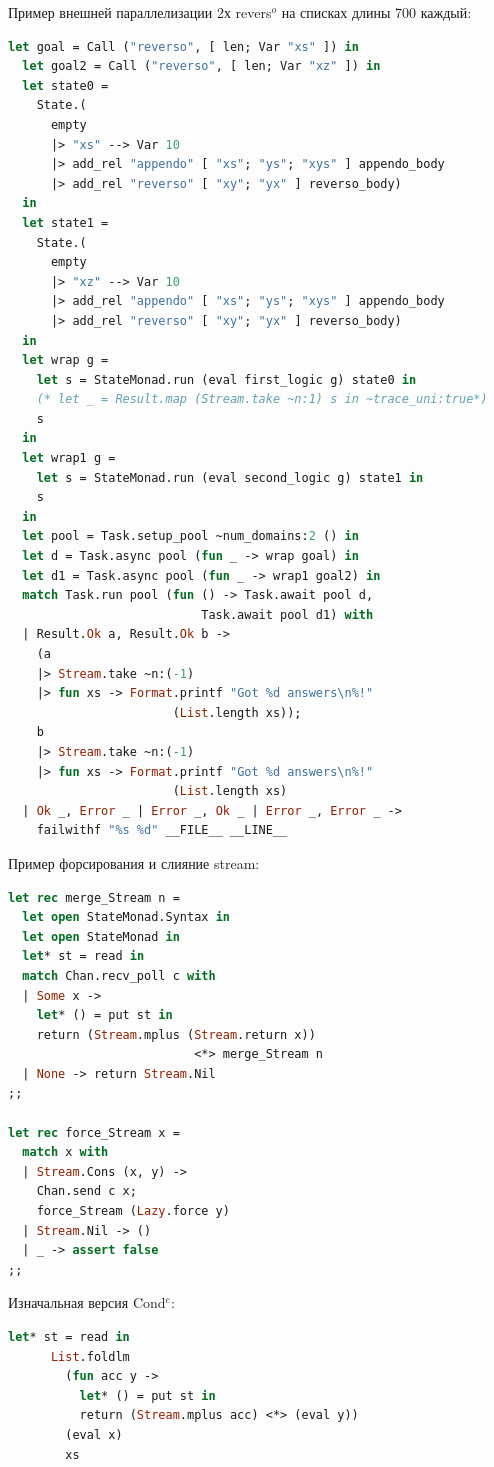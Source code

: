 Пример внешней параллелизации 2х revers$^o$ на списках длины 700 каждый:

\begin{lstlisting}[caption=parallel revers$^o$, language=OCaml, frame=single]
  let goal = Call ("reverso", [ len; Var "xs" ]) in
  let goal2 = Call ("reverso", [ len; Var "xz" ]) in
  let state0 =
    State.(
      empty
      |> "xs" --> Var 10
      |> add_rel "appendo" [ "xs"; "ys"; "xys" ] appendo_body
      |> add_rel "reverso" [ "xy"; "yx" ] reverso_body)
  in
  let state1 =
    State.(
      empty
      |> "xz" --> Var 10
      |> add_rel "appendo" [ "xs"; "ys"; "xys" ] appendo_body
      |> add_rel "reverso" [ "xy"; "yx" ] reverso_body)
  in
  let wrap g =
    let s = StateMonad.run (eval first_logic g) state0 in
    (* let _ = Result.map (Stream.take ~n:1) s in ~trace_uni:true*)
    s
  in
  let wrap1 g =
    let s = StateMonad.run (eval second_logic g) state1 in
    s
  in
  let pool = Task.setup_pool ~num_domains:2 () in
  let d = Task.async pool (fun _ -> wrap goal) in
  let d1 = Task.async pool (fun _ -> wrap1 goal2) in
  match Task.run pool (fun () -> Task.await pool d,
                           Task.await pool d1) with
  | Result.Ok a, Result.Ok b ->
    (a
    |> Stream.take ~n:(-1)
    |> fun xs -> Format.printf "Got %d answers\n%!"
                       (List.length xs));
    b
    |> Stream.take ~n:(-1)
    |> fun xs -> Format.printf "Got %d answers\n%!"
                       (List.length xs)
  | Ok _, Error _ | Error _, Ok _ | Error _, Error _ ->
    failwithf "%s %d" __FILE__ __LINE__
\end{lstlisting}

Пример форсирования и слияние stream:

\begin{lstlisting}[caption=merge stream, language=OCaml, frame=single]
  let rec merge_Stream n =
  let open StateMonad.Syntax in
  let open StateMonad in
  let* st = read in
  match Chan.recv_poll c with
  | Some x ->
    let* () = put st in
    return (Stream.mplus (Stream.return x)) 
                          <*> merge_Stream n
  | None -> return Stream.Nil
;;

let rec force_Stream x =
  match x with
  | Stream.Cons (x, y) ->
    Chan.send c x;
    force_Stream (Lazy.force y)
  | Stream.Nil -> ()
  | _ -> assert false
;;
\end{lstlisting}

Изначальная версия Cond$^e$:


\begin{lstlisting}[caption=parallel cond$^e$, language=OCaml, frame=single]
  let* st = read in
      List.foldlm
        (fun acc y ->
          let* () = put st in
          return (Stream.mplus acc) <*> (eval y))
        (eval x)
        xs
\end{lstlisting}

